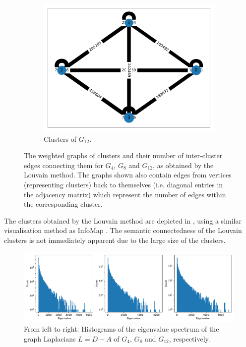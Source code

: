 \documentclass{prettytex/ox/mmsc-special-topic}
\begin{document}
\begin{figure}
\begin{subfigure}[b]{0.3\textwidth}
      \includegraphics[width=\textwidth]{figures/H-12-louvain.pdf}
      \caption{Clusters of $G_{12}$.}
      \label{fig:h-12}
    \end{subfigure}
    \caption{The weighted graphs of clusters and their number of inter-cluster edges connecting them for $G_4$, $G_8$ and $G_{12}$, as obtained by the Louvain method. The graphs shown also contain edges from vertices (representing clusters) back to themselves (i.e. diagonal entries in the adjacency matrix) which represent the number of edges within the corresponding cluster.}
    \label{fig:three graphs}
  \end{figure}

  The clusters obtained by the Louvain method are depicted in , using a similar visualisation method as InfoMap .
  The semantic connectedness of the Louvain clusters is not immediately apparent due to the large size of the clusters.

  \begin{figure}[H]
    \centering
    \includegraphics[width=\linewidth]{figures/spectrum-of-laplacian.pdf}
    \caption{From left to right: Histograms of the eigenvalue spectrum of the graph Laplacians $L = D - A$ of $G_4$, $G_8$ and $G_{12}$, respectively.}
    \label{fig:laplacians}
  \end{figure}
\end{document}
